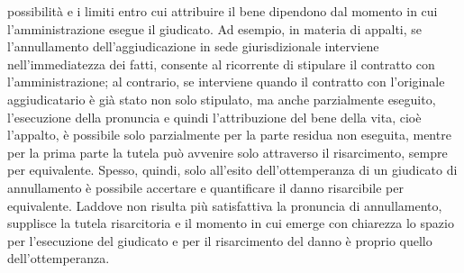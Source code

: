 \documentclass[12pt,it,a4paper,]{report}
\begin{document}
possibilità e i limiti entro cui attribuire il bene dipendono dal
momento in cui l'amministrazione esegue il giudicato. Ad esempio, in
materia di appalti, se l'annullamento dell'aggiudicazione in sede
giurisdizionale interviene nell'immediatezza dei fatti, consente al
ricorrente di stipulare il contratto con l'amministrazione; al
contrario, se interviene quando il contratto con l'originale
aggiudicatario è già stato non solo stipulato, ma anche parzialmente
eseguito, l'esecuzione della pronuncia e quindi l'attribuzione del bene
della vita, cioè l'appalto, è possibile solo parzialmente per la parte
residua non eseguita, mentre per la prima parte la tutela può avvenire
solo attraverso il risarcimento, sempre per equivalente. Spesso, quindi,
solo all'esito dell'ottemperanza di un giudicato di annullamento è
possibile accertare e quantificare il danno risarcibile per equivalente.
Laddove non risulta più satisfattiva la pronuncia di annullamento,
supplisce la tutela risarcitoria e il momento in cui emerge con
chiarezza lo spazio per l'esecuzione del giudicato e per il risarcimento
del danno è proprio quello dell'ottemperanza.
\end{document}
